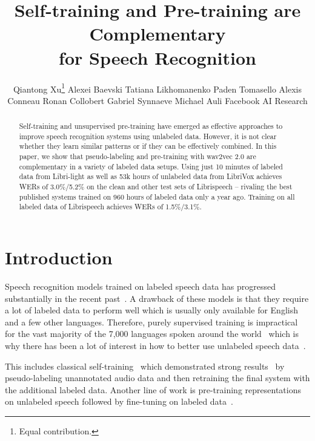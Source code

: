 \documentclass{article}
\title{\LARGE Self-training and Pre-training are Complementary\\for Speech Recognition}
\author{Qiantong Xu\thanks{Equal contribution.} \And 
Alexei Baevski \And 
Tatiana Likhomanenko \And
Paden Tomasello \And
Alexis Conneau \And
Ronan Collobert \And
Gabriel Synnaeve \And 
Michael Auli \AND
Facebook AI Research
}
\begin{document}
\maketitle

\begin{abstract}
Self-training and unsupervised pre-training have emerged as effective approaches to improve speech recognition systems using unlabeled data. 
However, it is not clear whether they learn similar patterns or if they can be effectively combined.
In this paper, we show that pseudo-labeling and pre-training with wav2vec 2.0 are complementary in a variety of labeled data setups.
Using just 10 minutes of labeled data from Libri-light as well as 53k hours of unlabeled data from LibriVox achieves WERs of 3.0\%/5.2\% on the clean and other test sets of Librispeech -- rivaling the best published systems trained on 960 hours of labeled data only a year ago.
Training on all labeled data of Librispeech achieves WERs of 1.5\%/3.1\%.
\end{abstract}



\section{Introduction}
\label{sec:intro}

Speech recognition models trained on labeled speech data has progressed substantially in the recent past~\cite{park2019specaugment,synnaeve2019end,han2020contextnet,gulati2020conformer}.
A drawback of these models is that they require a lot of labeled data to perform well which is usually only available for English and a few other languages.
Therefore, purely supervised training is impractical for the vast majority of the 7,000 languages spoken around the world~\cite{lewis2016ethnologue} which is why there has been a lot of interest in how to better use unlabeled speech data~\cite{liu2018adversarial,baskar2019semisupervised,hsu2020semisupervised}.

This includes classical self-training~\cite{scudder1965probability,yarowsky1995unsupervised,riloff1996auto} which demonstrated strong results~\cite{parthasarathi2019lessons,kahn2020st,synnaeve2019end,xu2020iterative,park2020improved} by pseudo-labeling unannotated audio data and then retraining the final system with the additional labeled data.
Another line of work is pre-training representations on unlabeled speech followed by fine-tuning on labeled data~\cite{oord2018cpc,schneider2019wav2vec,baevski2019vqwav2vec,chung2019apc,jiang2019improving,kawakami2020learning,rivire2020unsupervised,wang2020unsupervised,baevski2020wav}.
\end{document}

